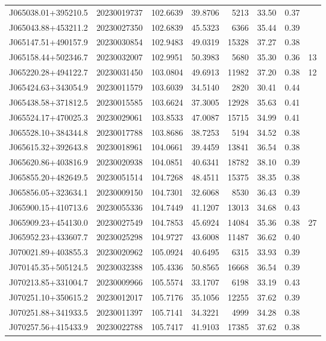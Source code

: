 \documentclass{article}
\begin{document}
\begin {longtable}{|l|l|r|r|r|r|r|l|}
 J065038.01+395210.5&  20230019737&  102.6639&   39.8706&  5213& 33.50& 0.37&\\
 J065043.88+453211.2&  20230027350&  102.6839&   45.5323&  6366& 35.44& 0.39&\\
 J065147.51+490157.9&  20230030854&  102.9483&   49.0319& 15328& 37.27& 0.38&\\
 J065158.44+502346.7&  20230032007&  102.9951&   50.3983&  5680& 35.30& 0.36&13\\
 J065220.28+494122.7&  20230031450&  103.0804&   49.6913& 11982& 37.20& 0.38&12\\
 J065424.63+343054.9&  20230011579&  103.6039&   34.5140&  2820& 30.41& 0.44&\\
 J065438.58+371812.5&  20230015585&  103.6624&   37.3005& 12928& 35.63& 0.41&\\
 J065524.17+470025.3&  20230029061&  103.8533&   47.0087& 15715& 34.99& 0.41&\\
 J065528.10+384344.8&  20230017788&  103.8686&   38.7253&  5194& 34.52& 0.38&\\
 J065615.32+392643.8&  20230018961&  104.0661&   39.4459& 13841& 36.54& 0.38&\\
 J065620.86+403816.9&  20230020938&  104.0851&   40.6341& 18782& 38.10& 0.39&\\
 J065855.20+482649.5&  20230051514&  104.7268&   48.4511& 15375& 38.35& 0.38&\\
 J065856.05+323634.1&  20230009150&  104.7301&   32.6068&  8530& 36.43& 0.39&\\
 J065900.15+410713.6&  20230055336&  104.7449&   41.1207& 13013& 34.68& 0.43&\\
 J065909.23+454130.0&  20230027549&  104.7853&   45.6924& 14084& 35.36& 0.38&27\\
 J065952.23+433607.7&  20230025298&  104.9727&   43.6008& 11487& 36.62& 0.40&\\
 J070021.89+403855.3&  20230020962&  105.0924&   40.6495&  6315& 33.93& 0.39&\\
 J070145.35+505124.5&  20230032388&  105.4336&   50.8565& 16668& 36.54& 0.39&\\
 J070213.85+331004.7&  20230009966&  105.5574&   33.1707&  6198& 33.19& 0.43&\\
 J070251.10+350615.2&  20230012017&  105.7176&   35.1056& 12255& 37.62& 0.39&\\
 J070251.88+341933.5&  20230011397&  105.7141&   34.3221&  4999& 34.28& 0.38&\\
 J070257.56+415433.9&  20230022788&  105.7417&   41.9103& 17385& 37.62& 0.38&\\

\end{longtable}
\end{document}
